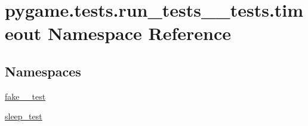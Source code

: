 \hypertarget{namespacepygame_1_1tests_1_1run__tests____tests_1_1timeout}{}\section{pygame.\+tests.\+run\+\_\+tests\+\_\+\+\_\+tests.\+timeout Namespace Reference}
\label{namespacepygame_1_1tests_1_1run__tests____tests_1_1timeout}
\subsection*{Namespaces}
\begin{DoxyCompactItemize}
\item 
 \hyperlink{namespacepygame_1_1tests_1_1run__tests____tests_1_1timeout_1_1fake__2__test}{fake\+\_\+\_\+test}
\item 
 \hyperlink{namespacepygame_1_1tests_1_1run__tests____tests_1_1timeout_1_1sleep__test}{sleep\+\_\+test}
\end{DoxyCompactItemize}
